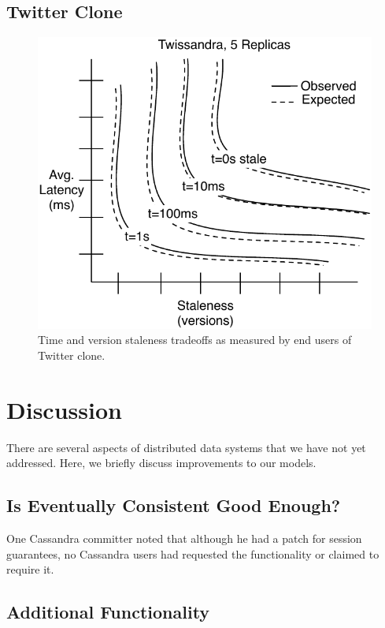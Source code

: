 \documentclass{vldb}
\begin{document}
\subsection{Twitter Clone}

\begin{figure}
\centering
\includegraphics[width=.8\columnwidth]{figs/twissandra.pdf}
\caption{Time and version staleness tradeoffs as measured by end users
  of Twitter clone.}
\label{fig:twissandra}
\end{figure}

\section{Discussion}
\label{sec:discussion}

There are several aspects of distributed data systems that we have not yet
addressed.  Here, we briefly discuss improvements to our models.

\subsection{Is Eventually Consistent Good Enough?}

One Cassandra committer noted that although he had a patch for session guarantees, no Cassandra users had requested the functionality or claimed to require it.

\subsection{Additional Functionality}
\end{document}
